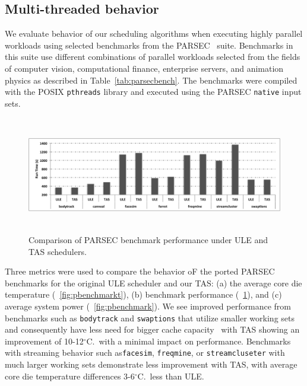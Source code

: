 \documentclass[times, 10pt,twocolumn]{IEEEtran}
\begin{document}
\subsection{Multi-threaded behavior}
\label{sec:mult-behav} We evaluate behavior of our scheduling algorithms
when executing highly parallel workloads using selected benchmarks from
the PARSEC~\cite{Bienia2008} suite. Benchmarks in this suite use
different combinations of parallel workloads selected from the fields of
computer vision, computational finance, enterprise servers, and
animation physics as described in Table~\ref{tab:parsecbench}.  The
benchmarks were compiled with the POSIX \texttt{pthreads} library and
executed using the PARSEC \texttt{native} input sets.

\begin{figure}[!tbp]
  \includegraphics[width=1.0\linewidth,height=2in]{graphics/parsecperformance}
  \caption{Comparison of PARSEC benchmark performance under ULE and TAS
schedulers.}
  \label{fig:pbenchmarkp}
\end{figure} 
Three metrics were used to compare the behavior oF the ported PARSEC
benchmarks for the original ULE scheduler and our TAS: (a) the average
core die temperature (\figurename~\ref{fig:pbenchmarkt}), (b) benchmark
performance (\figurename~\ref{fig:pbenchmarkp}), and (c) average system
power (\figurename~\ref{fig:pbenchmark}).  We see improved performance
from benchmarks such as \texttt{bodytrack} and \texttt{swaptions} that utilize
smaller working sets and consequently have less need for bigger cache
capacity~\cite{Bienia2011} with TAS showing an improvement of
10-12$^{\circ}$C.\ with a minimal impact on performance.  Benchmarks
with streaming behavior such as\texttt{facesim}, \texttt{freqmine}, or
\texttt{streamcluseter} with much larger working sets demonstrate less
improvement with TAS, with average core die temperature differences 3-6$^{\circ}$C.\ less
than ULE.
\end{document}
